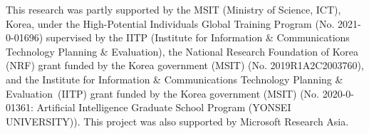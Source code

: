 \documentclass[sigconf]{acmart}
\begin{document}
\begin{acks}
This research was partly supported by the MSIT (Ministry of Science, ICT), Korea, under the High-Potential Individuals Global Training Program (No. 2021-0-01696) supervised by the IITP (Institute for Information \& Communications Technology Planning \& Evaluation), the National Research Foundation of Korea (NRF) grant funded by the Korea government (MSIT) (No. 2019R1A2C2003760), and the Institute for Information \& Communications Technology Planning \& Evaluation~(IITP) grant funded by the Korea government (MSIT) (No. 2020-0-01361: Artificial Intelligence Graduate School Program (YONSEI UNIVERSITY)). This project was also supported by Microsoft Research Asia.
\end{acks}



\end{document}
